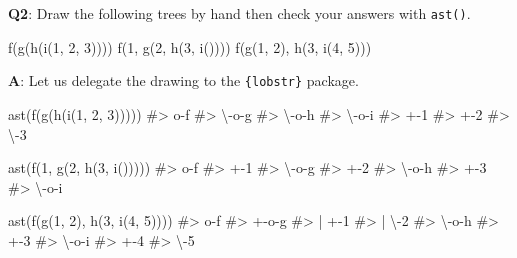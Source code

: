 \documentclass[
]{krantz}
\makeatletter
\newenvironment{Shaded}{\begin{snugshade}}{\end{snugshade}}
\newcommand{\CommentTok}[1]{\textcolor[rgb]{0.56,0.35,0.01}{\textit{#1}}}
\newcommand{\DecValTok}[1]{\textcolor[rgb]{0.00,0.00,0.81}{#1}}
\newcommand{\KeywordTok}[1]{\textcolor[rgb]{0.13,0.29,0.53}{\textbf{#1}}}
\newcommand{\NormalTok}[1]{#1}
\newenvironment{kframe}{%
\medskip{}
\setlength{\fboxsep}{.8em}
 \def\at@end@of@kframe{}%
 \ifinner\ifhmode%
  \def\at@end@of@kframe{\end{minipage}}%
  \begin{minipage}{\columnwidth}%
 \fi\fi%
 \def\FrameCommand##1{\hskip\@totalleftmargin \hskip-\fboxsep
 \colorbox{shadecolor}{##1}\hskip-\fboxsep
     \hskip-\linewidth \hskip-\@totalleftmargin \hskip\columnwidth}%
 \MakeFramed {\advance\hsize-\width
   \@totalleftmargin\z@ \linewidth\hsize
   \@setminipage}}%
 {\par\unskip\endMakeFramed%
 \at@end@of@kframe}
\renewenvironment{Shaded}{\begin{kframe}}{\end{kframe}}
\renewcommand{\KeywordTok} [1]{\textcolor[rgb]{0.00,0.44,0.13}{{#1}}}
\renewcommand{\DecValTok}  [1]{\textcolor[rgb]{0.25,0.63,0.44}{{#1}}}
\renewcommand{\CommentTok} [1]{\textcolor[rgb]{0.38,0.63,0.69}{{#1}}}
\renewcommand{\NormalTok}  [1]{{#1}}
\makeatother
\begin{document}
\textbf{{Q2}}: Draw the following trees by hand then check your answers with \texttt{ast()}.

\begin{Shaded}
\begin{Highlighting}[]
\KeywordTok{f}\NormalTok{(}\KeywordTok{g}\NormalTok{(}\KeywordTok{h}\NormalTok{(}\KeywordTok{i}\NormalTok{(}\DecValTok{1}\NormalTok{, }\DecValTok{2}\NormalTok{, }\DecValTok{3}\NormalTok{))))}
\KeywordTok{f}\NormalTok{(}\DecValTok{1}\NormalTok{, }\KeywordTok{g}\NormalTok{(}\DecValTok{2}\NormalTok{, }\KeywordTok{h}\NormalTok{(}\DecValTok{3}\NormalTok{, }\KeywordTok{i}\NormalTok{())))}
\KeywordTok{f}\NormalTok{(}\KeywordTok{g}\NormalTok{(}\DecValTok{1}\NormalTok{, }\DecValTok{2}\NormalTok{), }\KeywordTok{h}\NormalTok{(}\DecValTok{3}\NormalTok{, }\KeywordTok{i}\NormalTok{(}\DecValTok{4}\NormalTok{, }\DecValTok{5}\NormalTok{)))}
\end{Highlighting}
\end{Shaded}

\textbf{{A}}: Let us delegate the drawing to the \texttt{\{lobstr\}} package.

\begin{Shaded}
\begin{Highlighting}[]
\KeywordTok{ast}\NormalTok{(}\KeywordTok{f}\NormalTok{(}\KeywordTok{g}\NormalTok{(}\KeywordTok{h}\NormalTok{(}\KeywordTok{i}\NormalTok{(}\DecValTok{1}\NormalTok{, }\DecValTok{2}\NormalTok{, }\DecValTok{3}\NormalTok{)))))}
\CommentTok{#> o-f }
\CommentTok{#> \textbackslash{}-o-g }
\CommentTok{#>   \textbackslash{}-o-h }
\CommentTok{#>     \textbackslash{}-o-i }
\CommentTok{#>       +-1 }
\CommentTok{#>       +-2 }
\CommentTok{#>       \textbackslash{}-3}

\KeywordTok{ast}\NormalTok{(}\KeywordTok{f}\NormalTok{(}\DecValTok{1}\NormalTok{, }\KeywordTok{g}\NormalTok{(}\DecValTok{2}\NormalTok{, }\KeywordTok{h}\NormalTok{(}\DecValTok{3}\NormalTok{, }\KeywordTok{i}\NormalTok{()))))}
\CommentTok{#> o-f }
\CommentTok{#> +-1 }
\CommentTok{#> \textbackslash{}-o-g }
\CommentTok{#>   +-2 }
\CommentTok{#>   \textbackslash{}-o-h }
\CommentTok{#>     +-3 }
\CommentTok{#>     \textbackslash{}-o-i}

\KeywordTok{ast}\NormalTok{(}\KeywordTok{f}\NormalTok{(}\KeywordTok{g}\NormalTok{(}\DecValTok{1}\NormalTok{, }\DecValTok{2}\NormalTok{), }\KeywordTok{h}\NormalTok{(}\DecValTok{3}\NormalTok{, }\KeywordTok{i}\NormalTok{(}\DecValTok{4}\NormalTok{, }\DecValTok{5}\NormalTok{))))}
\CommentTok{#> o-f }
\CommentTok{#> +-o-g }
\CommentTok{#> | +-1 }
\CommentTok{#> | \textbackslash{}-2 }
\CommentTok{#> \textbackslash{}-o-h }
\CommentTok{#>   +-3 }
\CommentTok{#>   \textbackslash{}-o-i }
\CommentTok{#>     +-4 }
\CommentTok{#>     \textbackslash{}-5}
\end{Highlighting}
\end{Shaded}
\end{document}
